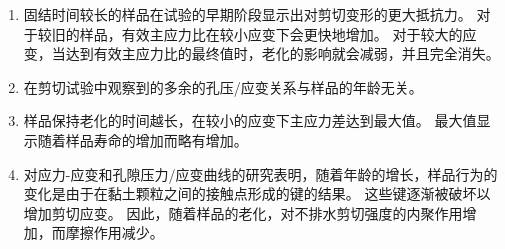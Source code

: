 \begin{paracol}{2}
    \begin{enumerate}
        \item 固结时间较长的样品在试验的早期阶段显示出对剪切变形的更大抵抗力。 对于较旧的样品，有效主应力比在较小应变下会更快地增加。 对于较大的应变，当达到有效主应力比的最终值时，老化的影响就会减弱，并且完全消失。
        \item 在剪切试验中观察到的多余的孔压/应变关系与样品的年龄无关。
        \item 样品保持老化的时间越长，在较小的应变下主应力差达到最大值。 最大值显示随着样品寿命的增加而略有增加。
        \item 对应力-应变和孔隙压力/应变曲线的研究表明，随着年龄的增长，样品行为的变化是由于在黏土颗粒之间的接触点形成的键的结果。 这些键逐渐被破坏以增加剪切应变。 因此，随着样品的老化，对不排水剪切强度的内聚作用增加，而摩擦作用减少。
    \end{enumerate}

\end{paracol}
